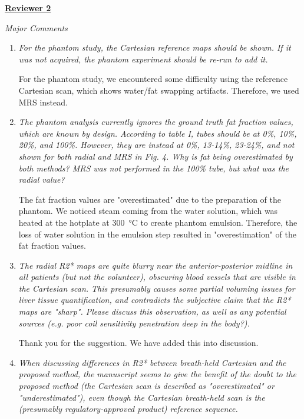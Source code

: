 \documentclass[a4paper,11pt]{report}
\begin{document}

\noindent \underline{\textbf{Reviewer 2}}

\noindent \textit{Major Comments}

\begin{enumerate}
	\item \textit{For the phantom study, the Cartesian reference maps should be shown. If it was not acquired, the phantom experiment should be re-run to add it.}

\hspace{1em} For the phantom study, 
we encountered some difficulty using the reference Cartesian scan, 
which shows water/fat swapping artifacts. Therefore, we used MRS instead.

	\item \textit{The phantom analysis currently ignores the ground truth fat fraction values, which are known by design. According to table I, tubes should be at 0\%, 10\%, 20\%, and 100\%. However, they are instead at 0\%, 13-14\%, 23-24\%, and not shown for both radial and MRS in Fig. 4. Why is fat being overestimated by both methods? MRS was not performed in the 100\% tube, but what was the radial value?}

\hspace{1em} The fat fraction values are "overestimated" due to the preparation of the phantom. We noticed steam coming from the water solution, which was heated at the hotplate at \SI{300}{\celsius} to create phantom emulsion. Therefore, the loss of water solution in the emulsion step resulted in "overestimation" of the fat fraction values. %

	\item \textit{The radial R2* maps are quite blurry near the anterior-posterior midline in all patients (but not the volunteer), obscuring blood vessels that are visible in the Cartesian scan. This presumably causes some partial voluming issues for liver tissue quantification, and contradicts the subjective claim that the R2* maps are "sharp". Please discuss this observation, as well as any potential sources (e.g. poor coil sensitivity penetration deep in the body?).}

\hspace{1em} Thank you for the suggestion. We have added this into discussion.

	\item \textit{When discussing differences in R2* between breath-held Cartesian and the proposed method, the manuscript seems to give the benefit of the doubt to the proposed method (the Cartesian scan is described as "overestimated" or "underestimated"), even though the Cartesian breath-held scan is the (presumably regulatory-approved product) reference sequence.}


\end{enumerate}
\end{document}
